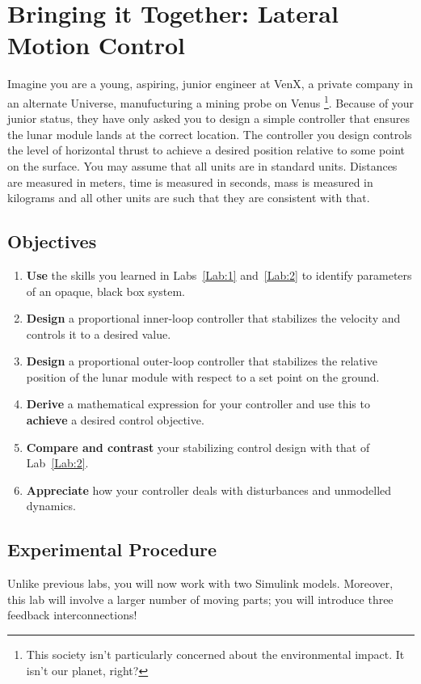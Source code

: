 \chapter{Bringing it Together: Lateral Motion Control}\label{Lab:3}
Imagine you are a young, aspiring, junior engineer at VenX, a private company in an alternate Universe, manufucturing a mining probe on Venus%
\footnote{This society isn't particularly concerned about the environmental impact. It isn't our planet, right?}.
Because of your junior status, they have only asked you to design a simple controller that ensures the lunar module lands at the correct location.
The controller you design controls the level of horizontal thrust to achieve a desired position relative to some point on the surface.
You may assume that all units are in standard units.
Distances are measured in meters, time is measured in seconds, mass is measured in kilograms and all other units are such that they are consistent with that.

\section{Objectives}
\begin{enumerate}[label=(\arabic*)]
  \item{
    \textbf{Use} the skills you learned in Labs~\ref{Lab:1} and~\ref{Lab:2}
    to identify parameters of an opaque, black box system.
  }
  \item{
    \textbf{Design} a proportional inner-loop controller that stabilizes the velocity and controls it to a desired value.
  }
  \item{
    \textbf{Design} a proportional outer-loop controller that stabilizes the relative position of the lunar module with respect to a set point on the ground.
  }
  \item{
    \textbf{Derive} a mathematical expression for your controller and use this to \textbf{achieve} a desired control objective.
  }
  \item{
    \textbf{Compare and contrast} your stabilizing control design with that of Lab~\ref{Lab:2}.
  }
  \item{
    \textbf{Appreciate} how your controller deals with disturbances and unmodelled dynamics.
  }
\end{enumerate}

\section{Experimental Procedure}\label{Lab:3:Experiment}
Unlike previous labs, you will now work with two Simulink models.
Moreover, this lab will involve a larger number of moving parts;
you will introduce three feedback interconnections!

